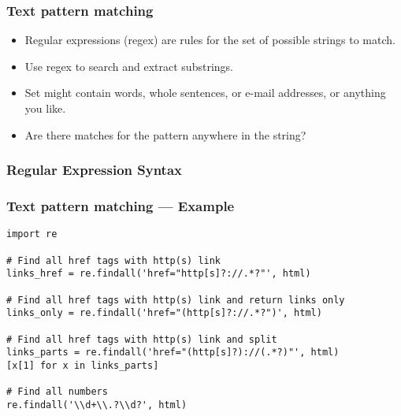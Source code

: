 
\begin{frame}
    \frametitle{Text pattern matching}
    \begin{itemize}
        \item Regular expressions (regex) are rules for the set of
        possible strings to match.
        \item Use regex to search and extract substrings.
        \item Set might contain words, whole sentences, or e-mail
        addresses, or anything you like.
        \item Are there matches for the pattern anywhere in the string?
    \end{itemize}
\end{frame}

\begin{frame}
    \frametitle{Regular Expression Syntax}
\end{frame}

\begin{frame}
    \frametitle{Text pattern matching --- Example}
\begin{verbatim}
import re

# Find all href tags with http(s) link
links_href = re.findall('href="http[s]?://.*?"', html)

# Find all href tags with http(s) link and return links only
links_only = re.findall('href="(http[s]?://.*?")', html)

# Find all href tags with http(s) link and split
links_parts = re.findall('href="(http[s]?)://(.*?)"', html)
[x[1] for x in links_parts]

# Find all numbers
re.findall('\\d+\\.?\\d?', html)
\end{verbatim}
\end{frame}